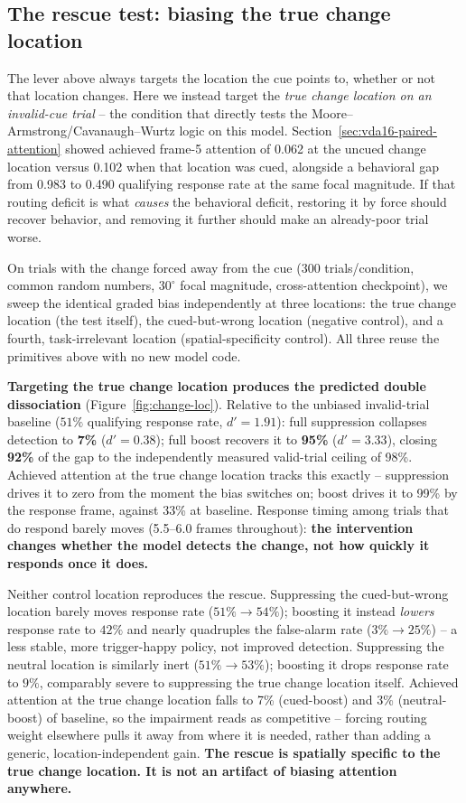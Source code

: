 \documentclass[10pt]{article}
\begin{document}
\subsection{The rescue test: biasing the true change location}\label{sec:pending-intervention}
The lever above always targets the location the cue points to, whether or not that location changes. Here we instead target the \emph{true change location on an invalid-cue trial} -- the condition that directly tests the Moore--Armstrong/Cavanaugh--Wurtz logic on this model. Section~\ref{sec:vda16-paired-attention} showed achieved frame-5 attention of 0.062 at the uncued change location versus 0.102 when that location was cued, alongside a behavioral gap from 0.983 to 0.490 qualifying response rate at the same focal magnitude. If that routing deficit is what \emph{causes} the behavioral deficit, restoring it by force should recover behavior, and removing it further should make an already-poor trial worse.

On trials with the change forced away from the cue (300 trials/condition, common random numbers, $30^\circ$ focal magnitude, cross-attention checkpoint), we sweep the identical graded bias independently at three locations: the true change location (the test itself), the cued-but-wrong location (negative control), and a fourth, task-irrelevant location (spatial-specificity control). All three reuse the primitives above with no new model code.

\textbf{Targeting the true change location produces the predicted double dissociation} (Figure~\ref{fig:change-loc}). Relative to the unbiased invalid-trial baseline ($51\%$ qualifying response rate, $d'=1.91$): full suppression collapses detection to \textbf{7\%} ($d'=0.38$); full boost recovers it to \textbf{95\%} ($d'=3.33$), closing \textbf{92\%} of the gap to the independently measured valid-trial ceiling of 98\%. Achieved attention at the true change location tracks this exactly -- suppression drives it to zero from the moment the bias switches on; boost drives it to 99\% by the response frame, against 33\% at baseline. Response timing among trials that do respond barely moves (5.5--6.0 frames throughout): \textbf{the intervention changes whether the model detects the change, not how quickly it responds once it does.}

Neither control location reproduces the rescue. Suppressing the cued-but-wrong location barely moves response rate ($51\%\to54\%$); boosting it instead \emph{lowers} response rate to $42\%$ and nearly quadruples the false-alarm rate ($3\%\to25\%$) -- a less stable, more trigger-happy policy, not improved detection. Suppressing the neutral location is similarly inert ($51\%\to53\%$); boosting it drops response rate to $9\%$, comparably severe to suppressing the true change location itself. Achieved attention at the true change location falls to 7\% (cued-boost) and 3\% (neutral-boost) of baseline, so the impairment reads as competitive -- forcing routing weight elsewhere pulls it away from where it is needed, rather than adding a generic, location-independent gain. \textbf{The rescue is spatially specific to the true change location. It is not an artifact of biasing attention anywhere.}
\end{document}
